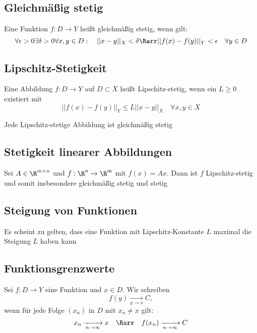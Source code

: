 	\subsection{Gleichmäßig stetig}
		\begin{Definition} [ Gleichmäßigkeit]
			Eine Funktion $f: D\to Y$ heißt gleichmäßig stetig, wenn gilt:
			$$
				\forall \epsilon > 0\exists\delta>0\forall x, y \in D: \quad ||x-y||_X < \delta \Rarr ||f(x)-f(y)||_Y<\epsilon \quad \forall y\in D
			$$
		\end{Definition}
	\subsection{Lipschitz-Stetigkeit}
		\begin{Definition} 
			Eine Abbildung $f: D\to Y$ auf $D\subset X$ heißt Lipschitz-stetig, wenn ein $L\geq 0$ existiert mit 
			$$
				||f(x)-f(y)||_Y\leq L||x-y||_X \quad \forall x, y \in X
			$$
		\end{Definition}
		\begin{Satz}[ ]
			Jede Lipschitz-stetige Abbildung ist gleichmäßig stetig
		\end{Satz}
	\subsection{Stetigkeit linearer Abbildungen}
		\begin{Satz} [ ]
			Sei $A\in \R^{m\times n}$ und $f: \R^n\to \R^m$ mit $f(x)=Ax$. Dann ist $f$ Lipschitz-stetig und somit insbesondere gleichmäßig stetig und stetig
		\end{Satz}
	\subsection{Steigung von Funktionen}
		Es scheint zu gelten, dass eine Funktion mit Lipschitz-Konstante $L$ maximal die Steigung $L$ haben kann
	\subsection{Funktionsgrenzwerte}
		\begin{Definition} [ ]
			Sei $f: D\to Y$ eine Funktion und $x \in D$. Wir schreiben
			$$
				f(y) \xrightarrow[y\to x]{} C,
			$$
			wenn für jede Folge $(x_n)$ in $D$ mit $x_n\not =x$ gilt:
			$$
				x_n\xrightarrow[n\to \infty]{}x \quad \Rarr  \quad f(x_n)\xrightarrow[n \to \infty]{}C
			$$
		\end{Definition}
	
			